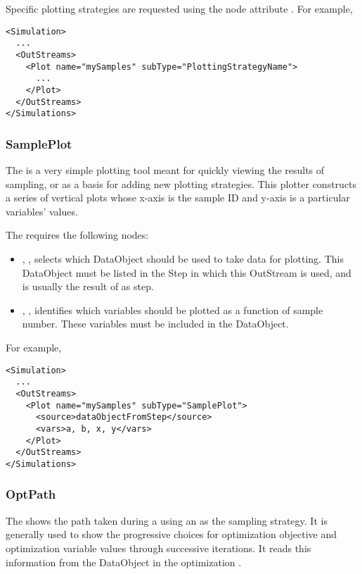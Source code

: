 Specific plotting strategies are requested using the  node attribute .
For example,
\begin{lstlisting}[style=XML]
<Simulation>
  ...
  <OutStreams>
    <Plot name="mySamples" subType="PlottingStrategyName">
      ...
    </Plot>
  </OutStreams>
</Simulations>
\end{lstlisting}

\subsubsection{SamplePlot}
The   is a very simple plotting tool meant for quickly
viewing the results of sampling, or as a basis for adding new plotting strategies. This plotter
constructs a series of vertical plots whose x-axis is the sample ID and y-axis is a particular
variables' values.

The   requires the following nodes:
\begin{itemize}
  \item {}, , selects which DataObject should be used
      to take data for plotting. This DataObject must be listed in the Step in which this
      OutStream is used, and is usually the result of as  step.
  \item {}, , identifies which variables should
      be plotted as a function of sample number. These variables must be included in the 
      DataObject.
\end{itemize}

For example,
\begin{lstlisting}[style=XML]
<Simulation>
  ...
  <OutStreams>
    <Plot name="mySamples" subType="SamplePlot">
      <source>dataObjectFromStep</source>
      <vars>a, b, x, y</vars>
    </Plot>
  </OutStreams>
</Simulations>
\end{lstlisting}

\subsubsection{OptPath}
The   shows the path taken during a  using
an  as the sampling strategy. It is generally used to show the progressive
choices for optimization objective and optimization variable values through successive iterations.
It reads this information from the  DataObject in the optimization
.

